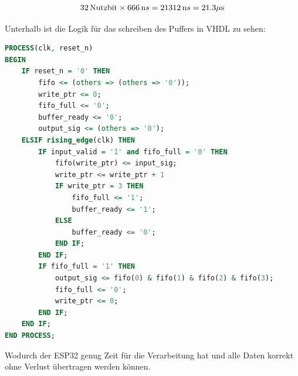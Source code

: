 \begin{equation}
    32 \, \text{Nutzbit} \times 666 \, \text ns = 21312 \, \text ns = 21.3 \mu\text s \label{eq:calc_nutzbit2}
\end{equation}

Unterhalb ist die Logik für das schreiben des Puffers in VHDL zu sehen:
\begin{lstlisting}[language=vhdl]
PROCESS(clk, reset_n)
BEGIN
    IF reset_n = '0' THEN
        fifo <= (others => (others => '0'));
        write_ptr <= 0;
        fifo_full <= '0';
        buffer_ready <= '0';
        output_sig <= (others => '0');
    ELSIF rising_edge(clk) THEN
        IF input_valid = '1' and fifo_full = '0' THEN
            fifo(write_ptr) <= input_sig;
            write_ptr <= write_ptr + 1
            IF write_ptr = 3 THEN
                fifo_full <= '1';
                buffer_ready <= '1';
            ELSE
                buffer_ready <= '0';
            END IF;
        END IF;
        IF fifo_full = '1' THEN
            output_sig <= fifo(0) & fifo(1) & fifo(2) & fifo(3);
            fifo_full <= '0';
            write_ptr <= 0;
        END IF;
    END IF;
END PROCESS;
\end{lstlisting}

Wodurch der ESP32 genug Zeit für die Verarbeitung hat und alle Daten korrekt ohne Verlust übertragen werden können.
